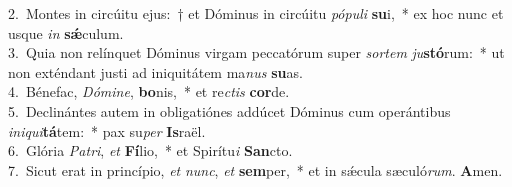 {2.~}Montes in circúitu ejus:~† et Dóminus in circúitu \textit{pó}\textit{pu}\textit{li} \textbf{su}i,~* ex hoc nunc et usque \textit{in} \textbf{sǽ}culum.\\
{3.~}Quia non relínquet Dóminus virgam peccatórum super \textit{sor}\textit{tem} \textit{ju}\textbf{stó}rum:~* ut non exténdant justi ad iniquitátem ma\textit{nus} \textbf{su}as.\\
{4.~}Bénefac, \textit{Dó}\textit{mi}\textit{ne}, \textbf{bo}nis,~* et re\textit{ctis} \textbf{cor}de.\\
{5.~}Declinántes autem in obligatiónes addúcet Dóminus cum operántibus \textit{i}\textit{ni}\textit{qui}\textbf{tá}tem:~* pax su\textit{per} \textbf{Is}raël.\\
{6.~}Glória \textit{Pa}\textit{tri}, \textit{et} \textbf{Fí}lio,~* et Spirítu\textit{i} \textbf{San}cto.\\
{7.~}Sicut erat in princípio, \textit{et} \textit{nunc}, \textit{et} \textbf{sem}per,~* et in sǽcula sæculó\textit{rum}. \textbf{A}men.\\

